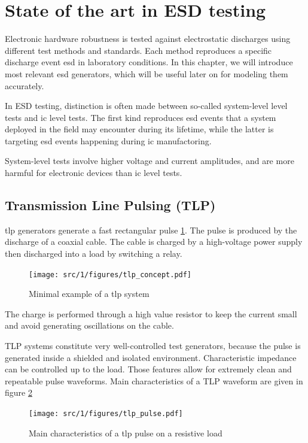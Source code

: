 \section{State of the art in ESD testing}
\label{sec:state-art-esd-testing}

Electronic hardware robustness is tested against electrostatic discharges using different test methods and standards.
Each method reproduces a specific discharge event \gls{esd} in laboratory conditions.
In this chapter, we will introduce most relevant \gls{esd} generators, which will be useful later on for modeling them accurately.

In ESD testing, distinction is often made between so-called system-level level tests and \gls{ic} level tests.
The first kind reproduces \gls{esd} events that a system deployed in the field may encounter during its lifetime, while the latter is targeting \gls{esd} events
happening during \gls{ic} manufactoring.

System-level tests involve higher voltage and current amplitudes, and are more harmful for electronic devices than \gls{ic} level tests.

\subsection{Transmission Line Pulsing (TLP)}

\gls{tlp} generators generate a fast rectangular pulse \ref{tlp_concept}.
The pulse is produced by the discharge of a coaxial cable.
The cable is charged by a high-voltage power supply then discharged into a load by switching a relay.

\begin{figure}[!h]
  \centering
  \texttt{[image: src/1/figures/tlp\_concept.pdf]}
  \caption{Minimal example of a \gls{tlp} system}
  \label{tlp_concept}
\end{figure}

The charge is performed through a high value resistor to keep the current small and avoid generating oscillations on the cable.

TLP systems constitute very well-controlled test generators, because the pulse is generated inside a shielded and isolated environment.
Characteristic impedance can be controlled up to the load.
Those features allow for extremely clean and repeatable pulse waveforms.
Main characteristics of a TLP waveform are given in figure \ref{tlp_pulse}

\begin{figure}[!h]
  \centering
  \texttt{[image: src/1/figures/tlp\_pulse.pdf]}
  \caption{Main characteristics of a \gls{tlp} pulse on a resistive load}
  \label{tlp_pulse}
\end{figure}

